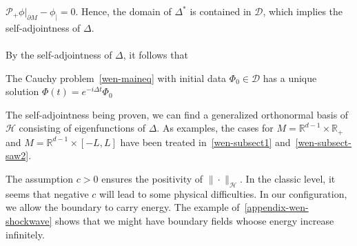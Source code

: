 $\mathcal{P}_+\phi\vert_{\partial M} - \phi_| = 0$.
Hence, the domain of $\Delta^*$ is contained in $\mathcal{D}$, which implies the self-adjointness of $\Delta$.\\\\
By the self-adjointness of $\Delta$, it follows that 
\begin{proposition}\label{wen-propwellposedness}
The Cauchy problem~\cref{wen-maineq} with initial data $\Phi_0\in\mathcal{D}$ has a unique solution $\Phi(t) = e^{-i\Delta t}\Phi_0 $
\end{proposition}
The self-adjointness being proven, 
we can find a generalized orthonormal basis of $\mathcal{H}$ consisting of eigenfunctions of $\Delta$.
As examples, the cases for $M = \mathbb{R}^{d-1}\times\mathbb{R}_+$ and $M = \mathbb{R}^{d-1}\times [-L, L]$ have been treated in~\cref{wen-subsect1} and~\cref{wen-subsect-saw2}.
\begin{remark}
The assumption $c>0$ ensures the positivity of $\|\cdot\|_\mathcal{H}$. 
In the classic level, it seems that negative $c$ will lead to some physical difficulties. 
In our configuration, we allow the boundary to carry energy.
The example of~\cref{appendix-wen-shockwave} shows that we might have boundary fields whoose energy increase infinitely.
\end{remark}

